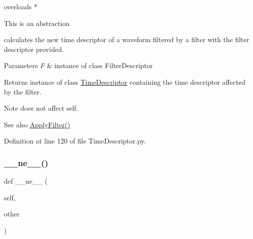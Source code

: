 overloads $\ast$ 

This is an abstraction

calculates the new time descriptor of a waveform filtered by a filter with the filter descriptor provided.


\begin{DoxyParams}{Parameters}
{\em F} & instance of class Filter\+Descriptor \\
\hline
\end{DoxyParams}
\begin{DoxyReturn}{Returns}
instance of class \hyperlink{classSignalIntegrity_1_1TimeDomain_1_1Waveform_1_1TimeDescriptor_1_1TimeDescriptor}{Time\+Descriptor} containing the time descriptor affected by the filter. 
\end{DoxyReturn}
\begin{DoxyNote}{Note}
does not affect self. 
\end{DoxyNote}
\begin{DoxySeeAlso}{See also}
\hyperlink{classSignalIntegrity_1_1TimeDomain_1_1Waveform_1_1TimeDescriptor_1_1TimeDescriptor_ad33074bdcb7626cce17d93fbd43ca1a9}{Apply\+Filter()} 
\end{DoxySeeAlso}


Definition at line 120 of file Time\+Descriptor.\+py.

\mbox{\label{classSignalIntegrity_1_1TimeDomain_1_1Waveform_1_1TimeDescriptor_1_1TimeDescriptor_aa0b54a20b36fcc55e1147de88d083072}} 
\subsubsection{\texorpdfstring{\+\_\+\+\_\+ne\+\_\+\+\_\+()}{\_\_ne\_\_()}}
{\footnotesize\ttfamily def \+\_\+\+\_\+ne\+\_\+\+\_\+ (\begin{DoxyParamCaption}\item[{}]{self,  }\item[{}]{other }\end{DoxyParamCaption})}



